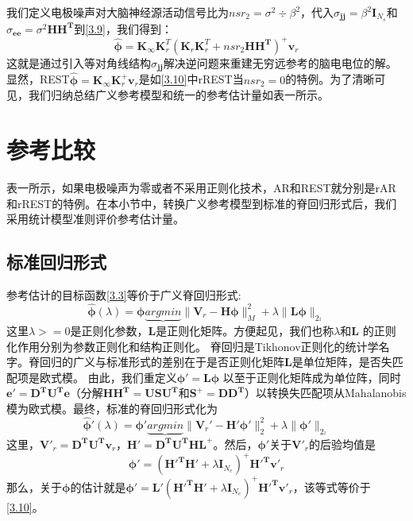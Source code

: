 我们定义电极噪声对大脑神经源活动信号比为$nsr_{2}=\sigma^{2}\div\beta^{2}$，代入$\sigma_{\mathbf{jj}}=\beta^{2}\mathbf{I}_{N_{s}}$和$\sigma_{\mathbf{ee}}=\sigma^{2}\mathbf{HH^{T}}$到\eqref{3.9}，我们得到：
\begin{equation}\label{3.10}
\hat{\mathbf{\phi}}=\mathbf{K}_{\infty}\mathbf{K}_{r}^{T}(\mathbf{K}_{r}\mathbf{K}_{r}^{T}+nsr_{2}\mathbf{HH^{T}})^{+}\mathbf{v}_{r}
\end{equation}
这就是通过引入等对角线结构$\sigma_{\mathbf{jj}}$解决逆问题来重建无穷远参考的脑电电位的解。显然，REST$\hat{\mathbf{\phi}}=\mathbf{K}_{\infty}\mathbf{K}_{r}^{+}\mathbf{v}_{r}$是如\eqref{3.10}中rREST当$nsr_{2}=0$的特例。为了清晰可见，我们归纳总结广义参考模型和统一的参考估计量如表一所示。

\section{参考比较}
表一所示，如果电极噪声为零或者不采用正则化技术，AR和REST就分别是rAR和rREST的特例。在本小节中，转换广义参考模型到标准的脊回归形式后，我们采用统计模型准则评价参考估计量。
\subsection{标准回归形式}
参考估计的目标函数\eqref{3.3}等价于广义脊回归形式:
\begin{equation}\label{3.11}
\hat{\mathbf{\phi}}(\lambda)=\mathbf{\phi}\underbrace{argmin}{\lVert\mathbf{V}_{r}-\mathbf{H\phi}\rVert_{M}^{2}+\lambda\lVert\mathbf{L\phi}\rVert_{2}_^{2}}
\end{equation}
这里$\lambda>=0$是正则化参数，$\mathbf{L}$是正则化矩阵。方便起见，我们也称$\lambda$和$\mathbf{L}$ 的正则化作用分别为参数正则化和结构正则化。
脊回归是Tikhonov正则化的统计学名字。脊回归的广义与标准形式的差别在于是否正则化矩阵$\mathbf{L}$是单位矩阵，是否失匹配项是欧式模。 由此，我们重定义$\mathbf{\phi\prime=L\phi}$ 以至于正则化矩阵成为单位阵，同时$\mathbf{e\prime=D^{T}U^{T}e}$（分解$\mathbf{HH^{T}=USU^{T}}$和$\mathbf{S}^{+}=\mathbf{DD^{T}}$）以转换失匹配项从Mahalanobis模为欧式模。最终，标准的脊回归形式化为
\begin{equation}\label{3.12}
\hat{\mathbf{\phi}}\prime(\lambda)=\mathbf{\phi}\prime\underbrace{argmin}{\lVert\mathbf{V}_{r}\prime-\mathbf{H\prime\phi\prime}\rVert_{2}^{2}+\lambda\lVert\mathbf{\phi}\prime\rVert_{2}_^{2}}
\end{equation}
这里，$\mathbf{V\prime}_{r}=\mathbf{D^{T}U^{T}v}_{r}$，$\mathbf{H\prime}=\mathbf{D^{T}U^{T}HL^{+}}$。然后，$\mathbf{\phi}\prime$关于$\mathbf{V\prime}_{r}$的后验均值是
\begin{equation}\label{3.12}
\mathbf{\phi}\prime=(\mathbf{H\prime^{T}}\mathbf{H}\prime+\lambda\mathbf{I}_{N_{e}})^{+}\mathbf{H\prime^{T}}\mathbf{v}\prime_r
\end{equation}
那么，关于$\mathbf{\phi}$的估计就是$
\mathbf{\phi}\prime=\mathbf{L}\prime(\mathbf{H\prime^{T}}\mathbf{H}\prime+\lambda\mathbf{I}_{N_{e}})^{+}\mathbf{H\prime^{T}}\mathbf{v}\prime_r$，该等式等价于\eqref{3.10}。
